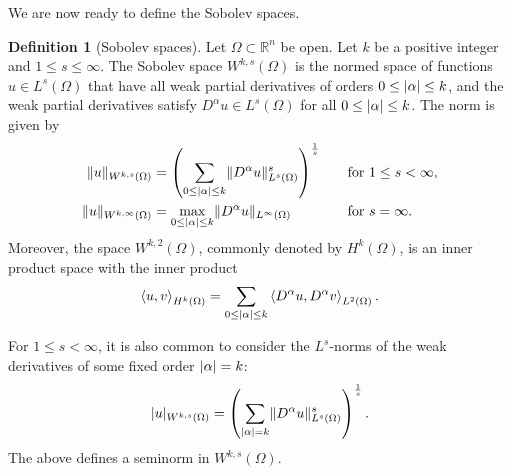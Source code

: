 \documentclass[english, 12pt, a4paper, sci, utf8, a-2b, online]{aaltothesis}
\theoremstyle{definition}
\newtheorem{definition}{Definition}[section]
\theoremstyle{plain}
\DeclarePairedDelimiter\abs{\lvert}{\rvert}
\DeclarePairedDelimiter\norm{\lVert}{\rVert}
\newcommand*{\innerprod}[2]{\left\langle #1, #2 \right\rangle}
\numberwithin{equation}{section}
\begin{document}
We are now ready to define the Sobolev spaces.
\begin{definition}[Sobolev spaces]
    \label{def:sobolevspaces}
    Let $\Omega \subset \mathbb{R}^n$ be open.
    Let $k$ be a positive integer and $1 \leq s \leq \infty$.
    The Sobolev space $W^{k,s}(\Omega)$ is the normed space of functions
    $u \in L^s(\Omega)$ that have all weak partial derivatives of orders
    $0 \leq \abs{\alpha} \leq k$, and the weak partial derivatives satisfy
    $D^{\alpha} u \in L^s(\Omega)$ for all $0 \leq \abs{\alpha} \leq k$.
    The norm is given by
    \begin{alignat*}{2}
        \norm{u}_{W^{k,s}(\Omega)}
        &= \left( \sum_{0 \leq \abs{\alpha} \leq k}
                \norm{D^{\alpha} u}_{L^s(\Omega)}^s \right)^{\frac{1}{s}}
                    &&\quad \text{for } 1 \leq s < \infty, \\
        \norm{u}_{W^{k,\infty}(\Omega)}
        &= \max_{0 \leq \abs{\alpha} \leq k}
                \norm{D^{\alpha} u}_{L^{\infty}(\Omega)}
                    &&\quad \text{for } s = \infty.
    \end{alignat*}
    Moreover, the space $W^{k,2}(\Omega)$, commonly denoted by $H^k(\Omega)$,
    is an inner product space with the inner product
    \begin{equation*}
        \innerprod{u}{v}_{H^k(\Omega)}
        = \sum_{0 \leq \abs{\alpha} \leq k}
                \innerprod{D^{\alpha} u}{D^{\alpha} v}_{L^2(\Omega)}.
    \end{equation*}
\end{definition}
For $1 \leq s < \infty$, it is also common to consider the
$L^s$-norms of the weak derivatives of some fixed order $\abs{\alpha} = k$:
\begin{equation*}
    \abs{u}_{W^{k,s}(\Omega)}
    = \left( \sum_{\abs{\alpha} = k}
                \norm{D^{\alpha} u}_{L^s(\Omega)}^s \right)^{\frac{1}{s}}.
\end{equation*}
The above defines a seminorm in $W^{k,s}(\Omega)$.
\end{document}
